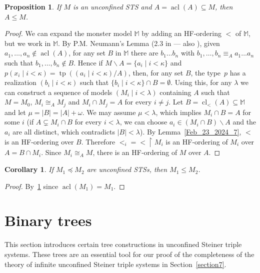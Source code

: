 \documentclass[a4paper, 11pt]{article}
\DeclareMathOperator{\cl}{cl}
\DeclareMathOperator{\acl}{acl}
\DeclareMathOperator{\tp}{tp}
\newcommand{\mons}{\mathbb{M}}
\theoremstyle{note}
\newtheorem{prop}[thm]{Proposition}
\newtheorem{cor}[thm]{Corollary}
\begin{document}
	
	\begin{prop} \label{Feb_23_2024_8} If  $M$ is an unconfined STS  and $A=\acl(A)\subseteq M$, then  $A\leq M$.
	\end{prop}
	\begin{proof}   We can expand the monster model $\mons$ by adding an HF-ordering $<$ of $\mons$, but we work in $\mons$.   
		By P.M. Neumann's Lemma (2.3 in \cite{pmneumann} --- also \cite[Corollary~4.2.2]{hodges}),  given  $a_1,\ldots,a_n\not\in \acl(A)$, for any set $B$ in $\mons$  there are $b_1\ldots b_n$ with $b_1,\ldots,b_n\equiv_A a_1\ldots a_n$ such that  $b_1,\ldots,b_n\not\in B$. Hence if $M\smallsetminus A=\{a_i\mid i<\kappa\}$  and  $p(x_i\mid i<\kappa)=\tp((a_i\mid i<\kappa)/A)$, then,  for any set $B$,  the type~$p$ has a realization  $(b_i\mid i<\kappa) $ such that   $\{b_i\mid i<\kappa\}\cap B=\emptyset$. Using this, for any $\lambda$  we can construct a sequence of models $(M_i\mid i<\lambda)$  containing $A$ such that  $M=M_0$, $M_i\cong_A M_j$  and $M_i\cap M_j=A$  for every $i\neq j$. Let $B=\cl_<(A)\subseteq \mons$ and let  $\mu= |B|= |A|+\omega$.  We may assume $\mu <\lambda$, which implies  $M_i\cap B = A$  for some $i$ (if $A\subsetneq M_i\cap B$ for every $i<\lambda$, we can choose $a_i\in (M_i\cap B)\smallsetminus A$ and the $a_i$ are all distinct, which contradicts $|B|<\lambda$).  By Lemma~\ref{Feb_23_2024_7}, $<$ is an HF-ordering over $B$. Therefore $<_i=<\restriction M_i$ is an HF-ordering of $M_i$ over  $A= B\cap M_i$. Since $M_i\cong_A M$,  there is an HF-ordering of $M$ over $A$.
	\end{proof}
	
	\begin{cor}\label{Feb_23_2024_9}  If $M_1\preccurlyeq M_2$  are unconfined  STSs, then  $M_1\leq M_2$.
	\end{cor}
	\begin{proof}  By~\ref{Feb_23_2024_8}  since  $\acl(M_1)=M_1$.
	\end{proof}
	
	
	
	\section{Binary trees} \label{section6}
	
	 This section introduces certain tree constructions in unconfined Steiner triple systems. These trees are an essential tool for our proof of the completeness of the theory of infinite unconfined Steiner triple systems in Section~\ref{section7}.
\end{document}
